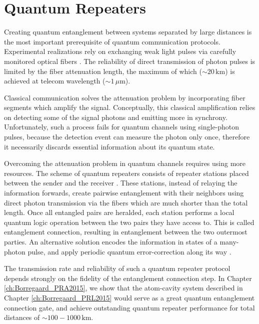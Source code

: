 \section{Quantum Repeaters}
Creating quantum entanglement between systems separated by
large distances is the most important prerequisite of quantum communication
protocols. Experimental realizations rely on exchanging weak light pulses
via carefully monitored optical fibers \cite{Peev2009}. The
reliability of direct transmission of photon pulses is limited by the
fiber attenuation length, the maximum of which ($\sim 20\,\mathrm{km}$) is
achieved at telecom wavelength ($\sim 1\,\mu\mathrm{m}$).

Classical communication solves the attenuation problem by incorporating fiber
segments which amplify the signal. Conceptually, this classical amplification
relies on detecting some of the signal photons and emitting more in synchrony.
Unfortunately, such a process fails for quantum channels using single-photon
pulses, because the detection event can measure the photon only once,
therefore it necessarily discards essential information about its quantum state.

Overcoming the attenuation problem in quantum channels requires using more
resources. The scheme of quantum repeaters consists of repeater stations placed
between the sender and the receiver \cite{bennett2, bennett, duan3}.
These stations, instead of relaying the information forwards, create pairwise
entanglement with their neighbors using direct photon transmission via the
fibers which are much shorter than the total length. Once all entangled pairs
are heralded, each station performs a local quantum logic operation between the
two pairs they have access to. This is called entanglement connection, resulting in
entanglement between the two outermost parties. An alternative solution 
encodes the information in states of a many-photon pulse, and apply periodic
quantum error-correction along its way \cite{Muralidharan2015}.

The transmission rate  and reliability of such a quantum repeater protocol
depends strongly on the fidelity of the entanglement connection step. In Chapter
\ref{ch:Borregaard_PRA2015}, we show that the atom-cavity system described
in Chapter \ref{ch:Borregaard_PRL2015} would serve as a great quantum
entanglement connection gate, and achieve outstanding quantum repeater
performance for total distances of $\sim 100-1000\,\mathrm{km}$.



